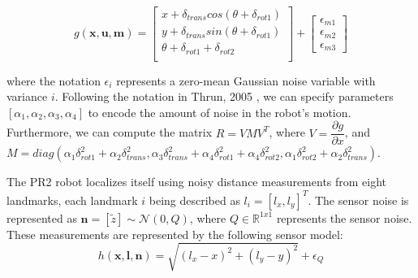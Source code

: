 \documentclass[journal]{IEEEtran}
\begin{document}
  $$g(\textbf{x},\textbf{u},\textbf{m}) =\begin{bmatrix}
  x + \delta_{trans}cos(\theta + \delta_{rot1})\\
  y + \delta_{trans}sin(\theta + \delta_{rot1})\\
  \theta + \delta_{rot1} + \delta_{rot2}\\
\end{bmatrix} + \begin{bmatrix}
  \epsilon_{m1} \\
  \epsilon_{m2} \\
  \epsilon_{m3}
\end{bmatrix}$$


where the notation $\epsilon_i$ represents a zero-mean Gaussian noise variable with variance $i$. Following the notation in Thrun, 2005 \cite{IEEEhowto:thrun}, we can specify parameters $[\alpha_1,\alpha_2,\alpha_3,\alpha_4]$ to encode the amount of noise in the robot's motion. Furthermore, we can compute the matrix $R = VMV^T$, where $V = \dfrac{\partial g}{\partial x}$, and $M = diag(\alpha_1\delta_{rot1}^2 + \alpha_2\delta_{trans}^2,\alpha_3\delta_{trans}^2 + \alpha_4\delta_{rot1}^2 + \alpha_4\delta_{rot2}^2,\alpha_1\delta_{rot2}^2 + \alpha_2\delta_{trans}^2)$.

The PR2 robot localizes itself using noisy distance measurements from eight landmarks, each landmark $i$ being described as $l_i = [l_x,l_y]^T$. The sensor noise is represented as $\textbf{n} = [\tilde{z}] \sim \mathcal{N}(0,Q)$, where $Q \in \mathbb{R}^{1x1}$ represents the sensor noise. These measurements are represented by the following sensor model:
$$h(\textbf{x},\textbf{l},\textbf{n}) = \sqrt{(l_x - x)^2 + (l_y - y)^2} + \epsilon_Q$$

\end{document}
